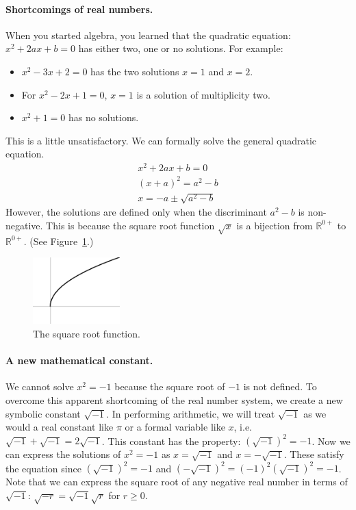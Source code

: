 \paragraph{Shortcomings of real numbers.}
When you started algebra, you learned that the quadratic equation:
$x^2 + 2 a x + b = 0$ has either two, one or no solutions.  For example:
\begin{itemize}
\item
  $x^2 - 3 x + 2 = 0$ has the two solutions $x = 1$ and $x = 2$.
\item
  For $x^2 - 2 x + 1 = 0$, $x = 1$ is a solution of multiplicity two.
\item
  $x^2 + 1 = 0$ has no solutions.
\end{itemize}
This is a little unsatisfactory.  
We can formally solve the general quadratic equation.
\begin{gather*}
  x^2 + 2 a x + b = 0 
  \\
  (x + a)^2 = a^2 - b 
  \\
  x = -a \pm \sqrt{a^2 - b}
\end{gather*}
However, the solutions are defined only when the discriminant $a^2 -
b$ is non-negative.  This is because the square root function $\sqrt{x}$
is a bijection from $\mathbb{R}^{0+}$ to $\mathbb{R}^{0+}$.  (See
Figure~\ref{figure fcv number yesqrtx}.)
\begin{figure}[h!]
  \begin{center}
    \includegraphics[width=0.3\textwidth]{fcv/number/yesqrtx}
  \end{center}
  \caption{The square root function.}
  \label{figure fcv number yesqrtx}
\end{figure}




\paragraph{A new mathematical constant.}
We cannot solve $x^2 = -1$ because the square root of $-1$ is not defined.  To
overcome this apparent shortcoming of the real number system, we
create a new symbolic constant $\sqrt{-1}$.  In performing arithmetic,
we will treat $\sqrt{-1}$ as we would a real constant like $\pi$ or a 
formal variable like $x$, i.e. $\sqrt{-1} + \sqrt{-1} = 2 \sqrt{-1}$.
This constant has the property:
$\left( \sqrt{-1} \right)^2 = -1$.  Now we can express the solutions
of $x^2 = -1$ as $x = \sqrt{-1}$ and $x = - \sqrt{-1}$.  These satisfy
the equation since $\left( \sqrt{-1} \right)^2 = -1$ and 
$\left( - \sqrt{-1} \right)^2 = (-1)^2 \left( \sqrt{-1} \right)^2 = -1$.
Note that we can express the square root of any negative real number in 
terms of $\sqrt{-1}$: $\sqrt{-r} = \sqrt{-1} \sqrt{r}$ for $r \geq 0$.  



